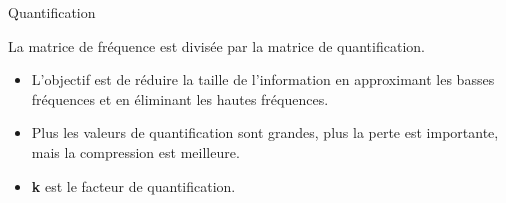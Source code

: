 \documentclass[xcolor=dvipsnames]{beamer}
\begin{document}
\begin{frame}{Quantification}
    \begin{minipage}{1\textwidth}
    La matrice de fréquence est divisée par la matrice de quantification.
        \begin{itemize}
            \item L'objectif est de réduire la taille de l'information en approximant les basses fréquences et en éliminant les hautes fréquences.
            \item Plus les valeurs de quantification sont grandes, plus la perte est importante, mais la compression est meilleure.
            \item \textbf{\Large k} est le facteur de quantification.
        \end{itemize}        
    \end{minipage}
    \hfill
    
    \vspace{17pt}

    \tiny 
    \begin{minipage}{0.29\textwidth}
        \centering
        \begin{table}
            \tiny 
            \centering
            \setlength{\tabcolsep}{2pt} %
            \renewcommand{\arraystretch}{1.2} %


\end{table}
\end{minipage}
\end{frame}
\end{document}
